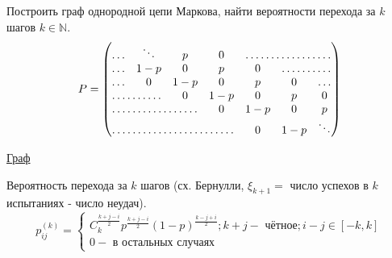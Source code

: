 \begin{exmp}\label{cm-ex_1}
	Построить граф однородной цепи Маркова, найти вероятности перехода за $k$ шагов $k \in \mathbb{N}$.
	\[
	P = 
	\begin{pmatrix}
		\ldots       & \ddots & p   & 0 & \hdotsfor{3} \\
		\ldots       & 1-p    & 0   & p & 0 & \hdotsfor{2} \\
		\ldots       & 0      & 1-p & 0 & p & 0 & \ldots \\
		\hdotsfor{2} & 0      & 1-p & 0 & p & 0 \\
		\hdotsfor{3} & 0      & 1-p & 0 & p \\
		\hdotsfor{4} & 0      & 1-p & \ddots
	\end{pmatrix}
	\]
\end{exmp}
\begin{center}
	\underline{Граф}
\end{center}
\begin{figure}[h]
\end{figure}
Вероятность перехода за $k$ шагов (сх. Бернулли, $\xi_{k+1} =$ число успехов в $k$ испытаниях - число неудач).
\[
p_{ij}^{(k)} =
\begin{cases}
	C_k^{\frac{k+j-i}{2}}p^{\frac{k+j-i}{2}} (1-p)^{\frac{k-j+i}{2}}; k+j - \text{ чётное}; i-j \in [-k, k] \\
	0 - \text{ в остальных случаях}
\end{cases}
\]


